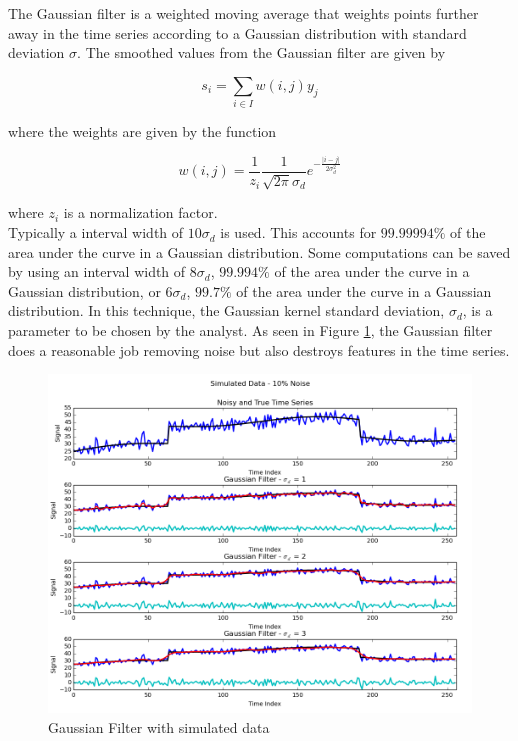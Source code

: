 \documentclass[11pt]{article}
\theoremstyle{definition}
\begin{document}
The Gaussian filter is a weighted moving average that weights points further away in the time series according to a Gaussian distribution with standard deviation $\sigma$. The smoothed values from the Gaussian filter are given by

\begin{displaymath}
s_i = \sum _{i \in I} w \left(i, j \right) y_j
\end{displaymath}

\noindent
where the weights are given by the function

\begin{displaymath}
w\left(i, j\right) = \frac{1}{z_i} \frac{1}{\sqrt{2 \pi} \sigma_d} e^{-\frac{\lvert i - j \rvert}{2 \sigma_d^2}}
\end{displaymath}

\noindent
where $z_i$ is a normalization factor.\\

Typically a interval width of $10 \sigma_d$ is used. This accounts for $99.99994\%$ of the area under the curve in a Gaussian distribution. Some computations can be saved by using an interval width of $8 \sigma_d$, $99.994\%$ of the area under the curve in a Gaussian distribution, or $6 \sigma_d$, $99.7\%$ of the area under the curve in a Gaussian distribution. In this technique, the Gaussian kernel standard deviation, $\sigma_d$, is a parameter to be chosen by the analyst. As seen in Figure \ref{gaussiancompare}, the Gaussian filter does a reasonable job removing noise but also destroys features in the time series.\\

\begin{figure}
\centering
\includegraphics[width = 0.75 \textwidth]{GaussianCompare.png}
\caption{Gaussian Filter with simulated data}
\label{gaussiancompare}
\end{figure}
\end{document}
